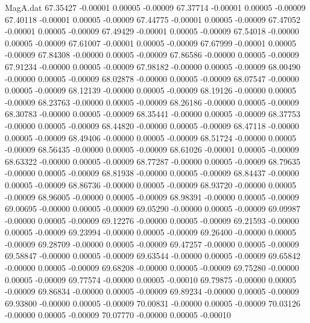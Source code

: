 \begin{filecontents}{MagA.dat}
  67.35427   -0.00001    0.00005   -0.00009
  67.37714   -0.00001    0.00005   -0.00009
  67.40118   -0.00001    0.00005   -0.00009
  67.44775   -0.00001    0.00005   -0.00009
  67.47052   -0.00001    0.00005   -0.00009
  67.49429   -0.00001    0.00005   -0.00009
  67.54018   -0.00000    0.00005   -0.00009
  67.61007   -0.00001    0.00005   -0.00009
  67.67999   -0.00001    0.00005   -0.00009
  67.84308   -0.00000    0.00005   -0.00009
  67.86586   -0.00000    0.00005   -0.00009
  67.91234   -0.00000    0.00005   -0.00009
  67.98182   -0.00000    0.00005   -0.00009
  68.00490   -0.00000    0.00005   -0.00009
  68.02878   -0.00000    0.00005   -0.00009
  68.07547   -0.00000    0.00005   -0.00009
  68.12139   -0.00000    0.00005   -0.00009
  68.19126   -0.00000    0.00005   -0.00009
  68.23763   -0.00000    0.00005   -0.00009
  68.26186   -0.00000    0.00005   -0.00009
  68.30783   -0.00000    0.00005   -0.00009
  68.35441   -0.00000    0.00005   -0.00009
  68.37753   -0.00000    0.00005   -0.00009
  68.44820   -0.00000    0.00005   -0.00009
  68.47118   -0.00000    0.00005   -0.00009
  68.49406   -0.00000    0.00005   -0.00009
  68.51724   -0.00000    0.00005   -0.00009
  68.56435   -0.00000    0.00005   -0.00009
  68.61026   -0.00001    0.00005   -0.00009
  68.63322   -0.00000    0.00005   -0.00009
  68.77287   -0.00000    0.00005   -0.00009
  68.79635   -0.00000    0.00005   -0.00009
  68.81938   -0.00000    0.00005   -0.00009
  68.84437   -0.00000    0.00005   -0.00009
  68.86736   -0.00000    0.00005   -0.00009
  68.93720   -0.00000    0.00005   -0.00009
  68.96005   -0.00000    0.00005   -0.00009
  68.98391   -0.00000    0.00005   -0.00009
  69.00695   -0.00000    0.00005   -0.00009
  69.05290   -0.00000    0.00005   -0.00009
  69.09987   -0.00000    0.00005   -0.00009
  69.12276   -0.00000    0.00005   -0.00009
  69.21593   -0.00000    0.00005   -0.00009
  69.23994   -0.00000    0.00005   -0.00009
  69.26400   -0.00000    0.00005   -0.00009
  69.28709   -0.00000    0.00005   -0.00009
  69.47257   -0.00000    0.00005   -0.00009
  69.58847   -0.00000    0.00005   -0.00009
  69.63544   -0.00000    0.00005   -0.00009
  69.65842   -0.00000    0.00005   -0.00009
  69.68208   -0.00000    0.00005   -0.00009
  69.75280   -0.00000    0.00005   -0.00009
  69.77574   -0.00000    0.00005   -0.00010
  69.79875   -0.00000    0.00005   -0.00009
  69.86834   -0.00000    0.00005   -0.00009
  69.89234   -0.00000    0.00005   -0.00009
  69.93800   -0.00000    0.00005   -0.00009
  70.00831   -0.00000    0.00005   -0.00009
  70.03126   -0.00000    0.00005   -0.00009
  70.07770   -0.00000    0.00005   -0.00010

\end{filecontents}
